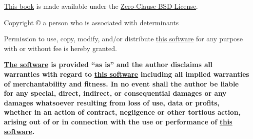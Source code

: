 \begingroup
\renewcommand{\thepage}{a}
\maketitle
\endgroup
\clearpage

\setcounter{page}{2}%
\thispagestyle{empty}%
\mbox{}
\vfill
\begingroup
\setlength{\parskip}{.5\baselineskip}
\setlength{\parindent}{0pt}

\href{https://github.com/septsea/det}{This book}
is made available under the
\href{https://opensource.org/license/0bsd}{Zero-Clause BSD License}.

\vspace{2ex}

Copyright © \thedate{}
\pdfmarkupcomment[opacity=0]%
{\protect\theauthor{}}%
{a person who is associated with determinants}

Permission to use, copy, modify, and/or distribute
\href{https://github.com/septsea/det}{this software}
for any purpose with or without fee is hereby granted.

\textbf{%
    \href{https://github.com/septsea/det}{The software}
    is provided ``as is'' and the author disclaims all warranties with regard to
    \href{https://github.com/septsea/det}{this software}
    including all implied warranties of merchantability and fitness. In no event shall the author be liable for any special, direct, indirect, or consequential damages or any damages whatsoever resulting from loss of use, data or profits, whether in an action of contract, negligence or other tortious action, arising out of or in connection with the use or performance of
    \href{https://github.com/septsea/det}{this software}.%
}

\endgroup
\clearpage
